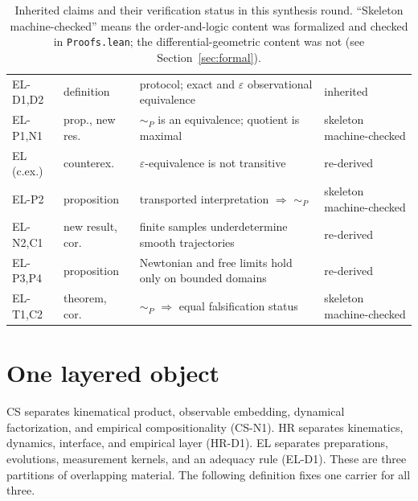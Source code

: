 \documentclass[11pt]{article}
\theoremstyle{plain}
\begin{document}
\begin{table}[h]
\begin{tabular}{@{}llp{6.6cm}l@{}}
EL-D1,D2 & definition & protocol; exact and $\varepsilon$ observational equivalence & inherited \\
EL-P1,N1 & prop., new res. & $\sim_P$ is an equivalence; quotient is maximal & skeleton machine-checked \\
EL (c.ex.) & counterex. & $\varepsilon$-equivalence is not transitive & re-derived \\
EL-P2 & proposition & transported interpretation $\Rightarrow$ $\sim_P$ & skeleton machine-checked \\
EL-N2,C1 & new result, cor. & finite samples underdetermine smooth trajectories & re-derived \\
EL-P3,P4 & proposition & Newtonian and free limits hold only on bounded domains & re-derived \\
EL-T1,C2 & theorem, cor. & $\sim_P$ $\Rightarrow$ equal falsification status & skeleton machine-checked \\
\bottomrule
\end{tabular}
\caption{Inherited claims and their verification status in this synthesis round.
``Skeleton machine-checked'' means the order-and-logic content was formalized and
checked in \texttt{Proofs.lean}; the differential-geometric content was not (see
Section~\ref{sec:formal}).}
\label{tab:inherited}
\end{table}

\section{One layered object}
\label{sec:object}

CS separates kinematical product, observable embedding, dynamical
factorization, and empirical compositionality (CS-N1). HR separates kinematics,
dynamics, interface, and empirical layer (HR-D1). EL separates preparations,
evolutions, measurement kernels, and an adequacy rule (EL-D1). These are three
partitions of overlapping material. The following definition fixes one carrier
for all three.
\end{document}
